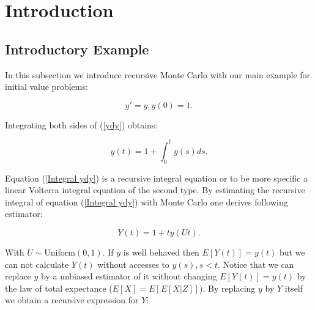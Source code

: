 \documentclass[a4paper,12pt]{article}
\begin{document}

\newpage
\tableofcontents
\newpage

\begin{abstract}
    We will write this at the end. Also need a dutch abstract
\end{abstract}

\section{Introduction}

\subsection{Introductory Example}
In this subsection we introduce recursive
Monte Carlo with our main example
for initial value problems:

\begin{equation} \label{ydy}
    y'=y, y(0)=1.
\end{equation}

Integrating both sides of (\ref{ydy}) obtains:

\begin{equation} \label{Integral ydy}
    y(t) = 1 + \int_{0}^{t} y(s) ds.
\end{equation}

Equation (\ref{Integral ydy}) is a recursive integral equation or to be more specific
a linear Volterra integral equation of the second type. By estimating the recursive integral
of equation (\ref{Integral ydy}) with Monte Carlo one derives following estimator:

\begin{equation}
    Y(t) = 1 + t y(Ut).
\end{equation}

With $U \sim \text{Uniform}(0,1)$. If $y$ is well behaved then $E[Y(t)]=y(t)$ but we can not
calculate $Y(t)$ without accesses to $y(s),s<t$. Notice that we can replace $y$ by a
unbiased estimator of it without changing $E[Y(t)]=y(t)$ by the law of total expectance
($E[X] = E[E[X|Z]]$). By replacing $y$ by $Y$ itself we obtain a recursive expression for $Y$:
\end{document}

